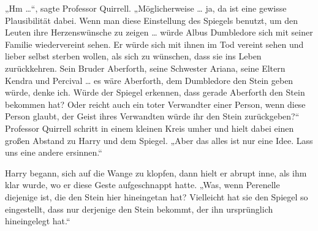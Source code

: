 „Hm …“, sagte Professor Quirrell.
„Möglicherweise … ja, da ist eine gewisse Plausibilität dabei. Wenn man diese Einstellung des Spiegels benutzt, um den Leuten ihre Herzenswünsche zu zeigen … würde Albus Dumbledore sich mit seiner Familie wiedervereint sehen. Er würde sich mit ihnen im Tod vereint sehen und lieber selbst sterben wollen, als sich zu wünschen, dass sie ins Leben zurückkehren. Sein Bruder Aberforth, seine Schwester Ariana, seine Eltern Kendra und Percival … es wäre Aberforth, dem Dumbledore den Stein geben würde, denke ich. Würde der Spiegel erkennen, dass gerade Aberforth den Stein bekommen hat? Oder reicht auch ein toter Verwandter einer Person, wenn diese Person glaubt, der Geist ihres Verwandten würde ihr den Stein zurückgeben?“
Professor Quirrell schritt in einem kleinen Kreis umher und hielt dabei einen großen Abstand zu Harry und dem Spiegel.
„Aber das alles ist nur eine Idee. Lass uns eine andere ersinnen.“

Harry begann, sich auf die Wange zu klopfen, dann hielt er abrupt inne, als ihm klar wurde, wo er diese Geste aufgeschnappt hatte.
„Was, wenn Perenelle diejenige ist, die den Stein hier hineingetan hat? Vielleicht hat sie den Spiegel so eingestellt, dass nur derjenige den Stein bekommt, der ihn ursprünglich hineingelegt hat.“

